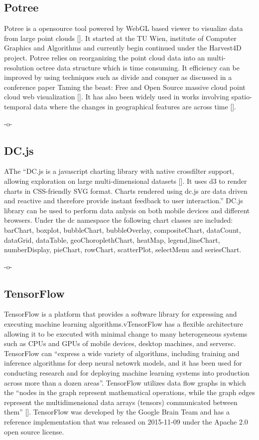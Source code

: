 \subsection{Potree }

Potree is a opensource tool powered by WebGL based viewer to visualize
data from large point clouds [\cite{www-potree}].  It started at the TU
Wien, institute of Computer Graphics and Algorithms and currently
begin continued under the Harvest4D project. Potree relies on
reorganizing the point cloud data into an multi-resolution octree data
structure which is time consuming. It efficiency can be improved by
using techniques such as divide and conquer as discussed in a
conference paper Taming the beast: Free and Open Source massive cloud
point cloud web visualization [\cite{potree-paper-1}]. It has also been
widely used in works involving spatio-temporal data where the changes
in geographical features are across time [\cite{potree-paper-2}].

    -o-
    
\subsection{DC.js}

AThe ``DC.js is a javascript charting library with
native crossfilter support, allowing exploration on large
multi-dimensional datasets [\cite{www-dcjs}]. It uses d3 to render
charts in CSS-friendly SVG format. Charts rendered using dc.js are
data driven and reactive and therefore provide instant feedback to
user interaction.'' DC.js library can be used to perform data anlysis
on both mobile devices and different browsers. Under the dc namespace
the following chart classes are included: barChart, boxplot,
bubbleChart, bubbleOverlay, compositeChart, dataCount, dataGrid,
dataTable, geoChoroplethChart, heatMap, legend,lineChart,
numberDisplay, pieChart, rowChart, scatterPlot, selectMenu and
seriesChart.

    -o-
      
\subsection{TensorFlow}

TensorFlow is a platform that provides a software library for
expressing and executing machine learning algorithms.vTensorFlow has a
flexible architecture allowing it to be executed with minimal change
to many heterogeneous systems such as CPUs and GPUs of mobile devices,
desktop machines, and serversc\cite{tensorflow-paper-2016}.
TensorFlow can ``express a wide variety of algorithms, including
training and inference algorithms for deep neural netowrk models, and
it has been used for conducting research and for deploying machine
learning systems into production across more than a dozen
areas''. TensorFlow utilizes data flow graphs in which the ``nodes in
the graph represent mathematical operations, while the graph edges
represent the multidimensional data arrays (tensors) communicated
between them'' [\cite{www-tensorflow}].  TensorFlow was developed by the
Google Brain Team and has a reference implementation that was released
on 2015-11-09 under the Apache 2.0 open source license.

